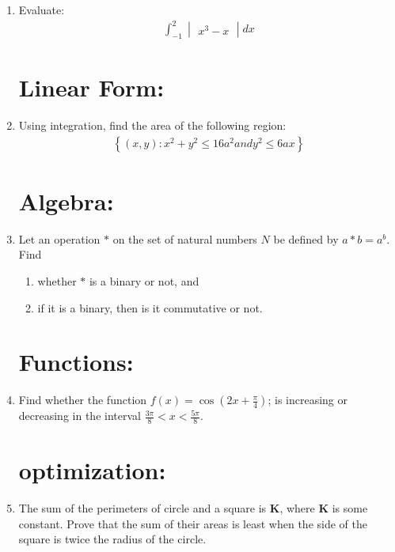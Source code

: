\documentclass[10pt,-letter paper]{article}
\providecommand{\cbrak}[1]{\ensuremath{\left\{#1\right\}}}
\providecommand{\brak}[1]{\ensuremath{\left(#1\right)}}
\newcommand{\mydet}[1]{\ensuremath{\begin{vmatrix}#1\end{vmatrix}}}
\begin{document}
\begin{enumerate}
 \item Evaluate:
	\begin{align*}
		\int_{-1}^{2} \mydet{x^{3}-x}{dx}
	\end{align*}
 
\section{Linear Form:}

 \item Using integration, find the area of the following region:
	\begin{align*}
        	\cbrak{\brak{x,y}:x^{2}+y^{2}\leq 16a^{2} and y^{2}\leq 6ax}
	\end{align*}
 
\section{Algebra:}

\item Let an operation $\ast$ on the set of natural numbers $N$ be defined by $a \ast b = a^{b}$. Find 
	\begin{enumerate}
		\item whether $\ast$ is a binary or not, and 
		\item if it is a binary, then is it commutative or not.
	\end{enumerate}
 
\section{Functions:}

\item Find whether the function $f\brak{x}=\cos\brak{{2x}+{\frac{\pi}{4}}}$; is increasing or decreasing in the interval $\frac{3\pi}{8}<x<\frac{5\pi}{8}$.

\section{optimization:}

\item The sum of the perimeters of circle and a square is $\mathbf{K}$, where $\mathbf{K}$ is some constant. Prove that the sum of their areas is least when the side of the square is twice the radius of the circle.

\end{enumerate}
\end{document}

